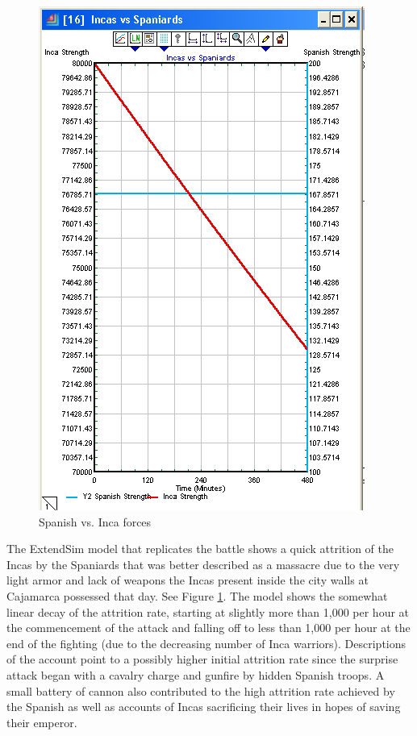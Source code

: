 \documentclass[letterpaper,10pt]{article}
\begin{document}
\begin{figure}[h!tp]
\begin{center}
\includegraphics[scale=0.4]{fig2a.png}
\caption{Spanish vs. Inca forces}
\label{fig2a}
\end{center}
\end{figure}

The ExtendSim model that replicates the battle shows a quick attrition of the Incas by the Spaniards that was better described as a massacre due to the very light armor and lack of weapons the Incas present inside the city walls at Cajamarca possessed that day.  See Figure \ref{fig2a}.  The model shows the somewhat linear decay of the attrition rate, starting at slightly more than 1,000 per hour at the commencement of the attack and falling off to less than 1,000 per hour at the end of the fighting (due to the decreasing number of Inca warriors).  Descriptions of the account point to a possibly higher initial attrition rate since the surprise attack began with a cavalry charge and gunfire by hidden Spanish troops.  A small battery of cannon also contributed to the high attrition rate achieved by the Spanish as well as accounts of Incas sacrificing their lives in hopes of saving their emperor.
\end{document}
